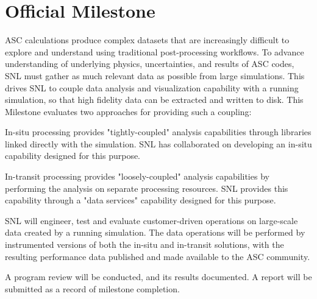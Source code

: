 \section{Official Milestone}
\label{sec:OfficialMilestone}

ASC calculations produce complex datasets that are increasingly difficult to explore and understand using traditional post-processing workflows.  To advance understanding of underlying physics, uncertainties, and results of ASC codes, SNL must gather as much relevant data as possible from large simulations.  This drives SNL to couple data analysis and visualization capability with a running simulation, so that high fidelity data can be extracted and written to disk.  This Milestone evaluates two approaches for providing such a coupling:

\begin{enumerate}
\begin{item}
In-situ processing provides "tightly-coupled" analysis capabilities through libraries linked directly with the simulation.  SNL has collaborated on developing an in-situ capability designed for this purpose.
\end{item}
\begin{item}
In-transit processing provides "loosely-coupled" analysis capabilities by performing the analysis on separate processing resources.  SNL provides this capability through a "data services" capability designed for this purpose.
\end{item}
\end{enumerate}

SNL will engineer, test and evaluate customer-driven operations on large-scale data created by a running simulation.  The data operations will be performed by instrumented versions of both the in-situ and in-transit solutions, with the resulting performance data published and made available to the ASC community.

A program review will be conducted, and its results documented.  A report will be submitted as a record of milestone completion.

